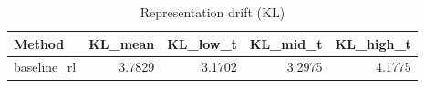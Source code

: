 \begin{table}[htbp]
\centering
\caption{Representation drift (KL)}
\label{tab:repr-drift}
\begin{tabular}{lrrrr}
\toprule
\textbf{Method} & \textbf{KL\_mean} & \textbf{KL\_low\_t} & \textbf{KL\_mid\_t} & \textbf{KL\_high\_t} \\
\midrule
baseline\_rl & 3.7829 & 3.1702 & 3.2975 & 4.1775 \\
\bottomrule
\end{tabular}
\end{table}